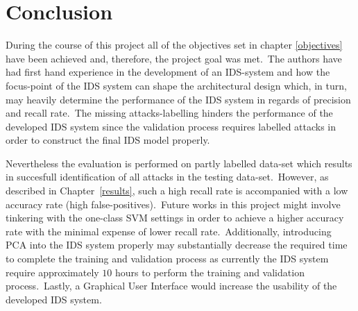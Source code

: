 \chapter{Conclusion}
\label{conclusion}

	During the course of this project all of the objectives set in chapter \ref{objectives} have been achieved and, therefore, the project goal was met.\ The authors have had first hand experience in the development of an IDS-system and how the focus-point of the IDS system can shape the architectural design which, in turn, may heavily determine the performance of the IDS system in regards of precision and recall rate.\ The missing attacks-labelling hinders the performance of the developed IDS system since the validation process requires labelled attacks in order to construct the final IDS model properly.
	
	Nevertheless the evaluation is performed on partly labelled data-set which results in succesfull identification of all attacks in the testing data-set.\ However, as described in Chapter~\ref{results}, such a high recall rate is accompanied with a low accuracy rate (high false-positives).\ Future works in this project might involve tinkering with the one-class SVM settings in order to achieve a higher accuracy rate with the minimal expense of lower recall rate.\ Additionally, introducing PCA into the IDS system properly may substantially decrease the required time to complete the training and validation process as currently the IDS system require approximately $10$ hours to perform the training and validation process.\ Lastly, a Graphical User Interface would increase the usability of the developed IDS system.